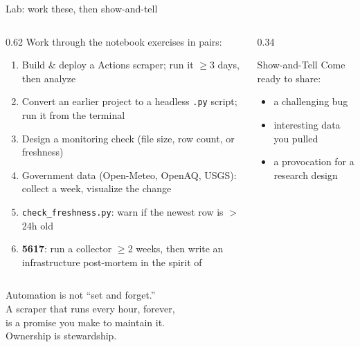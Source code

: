 \documentclass[9pt,aspectratio=169]{beamer}
\begin{document}
\begin{frame}{Lab: work these, then show-and-tell}
    \begin{columns}[T]
        \begin{column}{0.62\textwidth}
            Work through the notebook exercises in pairs:
            \begin{enumerate}\small
                \item Build \& deploy a Actions scraper; run it $\geq$3 days, then analyze
                \item Convert an earlier project to a headless \texttt{.py} script; run it from the terminal
                \item Design a monitoring check (file size, row count, or freshness)
                \item Government data (Open-Meteo, OpenAQ, USGS): collect a week, visualize the change
                \item \texttt{check\_freshness.py}: warn if the newest row is $>$24h old
                \item[6.] \textcolor{tab-purple}{\textbf{5617}}: run a collector $\geq$2 weeks, then write an infrastructure post-mortem in the spirit of \textcite{wilson2017good}
            \end{enumerate}
        \end{column}
        \begin{column}{0.34\textwidth}
            \begin{block}{Show-and-Tell}
                \footnotesize Come ready to share:
                \begin{itemize}\footnotesize
                    \item a challenging bug
                    \item interesting data you pulled
                    \item a provocation for a research design
                \end{itemize}
            \end{block}
        \end{column}
    \end{columns}
\end{frame}

\begin{frame}[standout]
    Automation is not ``set and forget.''\\
    A scraper that runs every hour, forever,\\
    is a promise you make to maintain it.\\[1em]
    {\large Ownership is stewardship.}
\end{frame}
\end{document}

